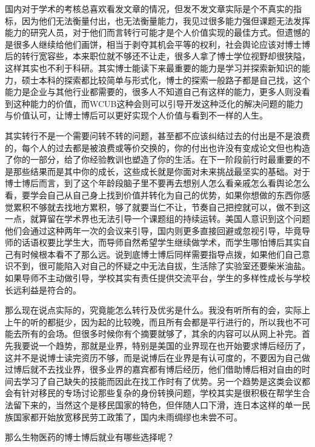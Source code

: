 \documentclass[]{book}
\begin{document}
国内对于学术的考核总喜欢看发文章的情况，但发不发文章实际是个不真实的指标，因为他们无法衡量付出，也无法衡量能力，我见过很多能力强但课题无法发挥能力的研究人员，对于他们而言转行可能才是个人价值实现的最佳方式。但遗憾的是很多人继续给他们画饼，相当于剥夺其机会平等的权利，社会舆论应该对博士博后的转行宽容些，本来职位就不够还不让走，很多人拿了博士学位视野却很狭隘，这样其实也不利于科研。其实博士能读下来最重要的能力是学习并探索新知识的能力，硕士本科的探索都比较简单与形式化，博士的探索一般路子都是自己找，这个能力是企业与其他行业都需要的，很多人不知道自己有这样的能力，更多人则没看到这种能力的价值，而WCUB这种会则可以引导开发这种泛化的解决问题的能力与价值认可，让博士博后可以更好实现个人价值与看到不一样的人生。

其实转行不是一个需要问转不转的问题，甚至都不应该纠结过去的付出是不是浪费的，每个人的过去都是被浪费或等价交换的，你的付出也许没有变成论文但也构造了你的一部分，给了你经验教训也塑造了你的生活。在下一阶段前行时最重要的不是那些结果而是其中你的成长，这些成长就是你面对未来挑战最坚实的基础。对于博士博后而言，到了这个年龄段脑子里不要再去想别人怎么看亲戚怎么看舆论怎么看，要学会自己从自己身上找到价值并转化为自己的优势，如果你想做的东西你感觉累积不够就去找地方累积，够了就要当仁不让，节奏自己把控就可以，做不到这一点，就算留在学术界也无法引导一个课题组的持续运转。美国人意识到这个问题他们会通过这种两年一次的会议来引导，国内则更多直接回避或忽视引导，毕竟导师的话语权要比学生大，而导师自然希望学生继续做学术，而学生哪怕博后其实自己有时候根本看不了那么远。说到底博士博后同样需要指导点拨，如果他们自己意识不到，很可能陷入对自己的怀疑之中无法自拔，生活除了实验室还要柴米油盐。如果导师不主动做引导，学校其实有责任提供交流平台，学生的多样性成长与学校长远利益是符合的。

那么现在说点实际的，究竟能怎么转行及优劣是什么。我没有听所有的会，实际上上午的听的都挺少，因为起的比较晚，而且所有会都是平行进行的，所以我也不可能去所有的会场。但很多时候你有个摘要就够了，其余的内容可以从网上补完。首先我要说一个趋势，那就是业界，特别是美国的业界现在也开始要求博后经历了，这并不是说博士读完资历不够，而是说博后在业界是有认可度的，不要因为自己做过博后就不去找业界，很多业界的嘉宾都有博后经历，他们借助博后相对自由的时间去学习了自己缺失的技能而因此在找工作时有了优势。另一个趋势是这类会议都会有针对移民的专场讨论那些复杂的身份转换问题，学校其实是很积极在帮学生合法留下来的，当然这个是移民国家的特色，但伴随人口下滑，连日本这样的单一民族国家都开始放宽移民劳工政策了，国内未雨绸缪也未尝不可。

那么生物医药的博士博后就业有哪些选择呢？
\end{document}
